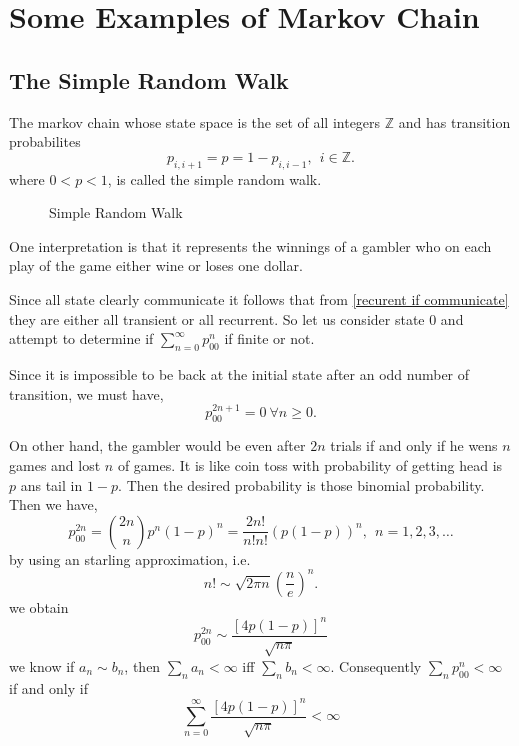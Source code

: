 \chapter{Some Examples of Markov Chain}
\section{The Simple Random Walk}
The markov chain whose state space is the set of all integers $ \mathds{Z} $ and has transition probabilites
\[
    p_{i,i+1} = p = 1-p_{i,i-1}, \ \ i\in\mathds{Z}.
\]
where $ 0<p<1 $, is called the simple random walk.

\begin{figure}[h]
    \centering
    \caption{Simple Random Walk}
    \label{Simple random walk}
\end{figure}

One interpretation is that it represents the winnings of a gambler who on each play of the game either wine or loses one dollar.

Since all state clearly communicate it follows that from \cref{recurent if communicate} they are either all transient or all recurrent. 
So let us consider state 0 and
attempt to determine if  $ \sum_{n=0}^{\infty} p_{00}^{n} $ if finite or not.

Since it is impossible to be back at the initial state after an odd number of transition, we must have,
\[
    p^{2n+1}_{00} = 0 \ \forall n\ge 0.
\]

On other hand, the gambler would be even after $ 2n $ trials if and only if he wens  $ n $ games and lost  $ n $ of games.
It is like coin toss with probability of getting head is $ p $ ans tail in  $ 1-p $. Then the desired probability is those binomial probability.
Then we have,
 \[
     p^{2n}_{00} = \binom{2n}{n}p^{n}(1-p)^{n} = \frac{2n!}{n!n!}(p(1-p))^{n}, \ \ n=1,2,3,\ldots
\]
by using an starling approximation,
i.e.
\[
    n! \sim \sqrt{2\pi n}\left(\frac{n}{e}\right)^{n}.
\]
we obtain 
\[
    p^{2n}_{00}\sim \frac{[4p(1-p)]^{n}}{\sqrt{n\pi}}
\]
we know if $ a_{n}\sim b_{n} $, then $ \sum_{n}a_{n}<\infty  $ iff $ \sum_{n}b_{n}<\infty  $. Consequently $ \sum_{n}p^{n}_{00}<\infty  $ 
if and only if
\[
    \sum_{n=0}^{\infty} \frac{[4p(1-p)]^{n}}{\sqrt{n\pi}} < \infty
\]

